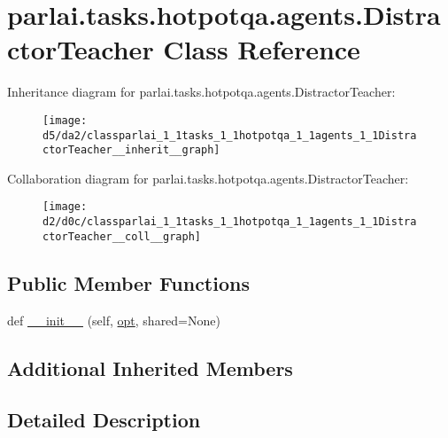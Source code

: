 \hypertarget{classparlai_1_1tasks_1_1hotpotqa_1_1agents_1_1DistractorTeacher}{}\section{parlai.\+tasks.\+hotpotqa.\+agents.\+Distractor\+Teacher Class Reference}
\label{classparlai_1_1tasks_1_1hotpotqa_1_1agents_1_1DistractorTeacher}


Inheritance diagram for parlai.\+tasks.\+hotpotqa.\+agents.\+Distractor\+Teacher\+:\nopagebreak
\begin{figure}[H]
\begin{center}
\leavevmode
\texttt{[image: d5/da2/classparlai\_1\_1tasks\_1\_1hotpotqa\_1\_1agents\_1\_1DistractorTeacher\_\_inherit\_\_graph]}
\end{center}
\end{figure}


Collaboration diagram for parlai.\+tasks.\+hotpotqa.\+agents.\+Distractor\+Teacher\+:\nopagebreak
\begin{figure}[H]
\begin{center}
\leavevmode
\texttt{[image: d2/d0c/classparlai\_1\_1tasks\_1\_1hotpotqa\_1\_1agents\_1\_1DistractorTeacher\_\_coll\_\_graph]}
\end{center}
\end{figure}
\subsection*{Public Member Functions}
\begin{DoxyCompactItemize}
\item 
def \hyperlink{classparlai_1_1tasks_1_1hotpotqa_1_1agents_1_1DistractorTeacher_a933e9ee4fe9a8557477562a9a05d598c}{\+\_\+\+\_\+init\+\_\+\+\_\+} (self, \hyperlink{classparlai_1_1core_1_1agents_1_1Teacher_a3ce6243860ce978a897922863ed32fa4}{opt}, shared=None)
\end{DoxyCompactItemize}
\subsection*{Additional Inherited Members}


\subsection{Detailed Description}



